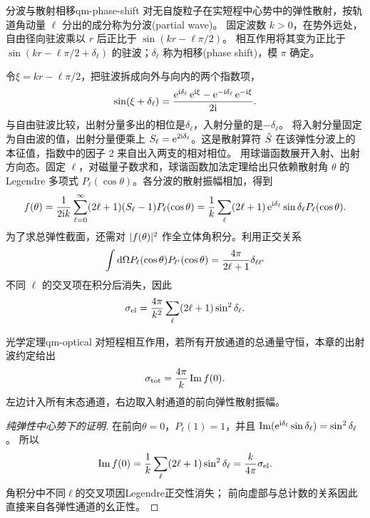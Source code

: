\begin{definition}{分波与散射相移}{qm-phase-shift}
    对无自旋粒子在实短程中心势中的弹性散射，按轨道角动量 $\ell$ 分出的成分称为分波(partial wave)。
    固定波数 $k > 0$，在势外远处，自由径向驻波乘以 $r$ 后正比于 $\sin(kr - \ell\pi/2)$。
    相互作用将其变为正比于 $\sin(kr - \ell\pi/2 + \delta_\ell)$ 的驻波；$\delta_\ell$ 称为相移(phase shift)，模 $\pi$ 确定。
\end{definition}
令$\xi = kr - \ell\pi/2$，把驻波拆成向外与向内的两个指数项，
\[
    \sin(\xi + \delta_\ell)
    = \frac{\mathop{}\!\mathrm{e}^{\mathrm{i}\delta_\ell}\mathop{}\!\mathrm{e}^{\mathrm{i}\xi}
         - \mathop{}\!\mathrm{e}^{-\mathrm{i}\delta_\ell}\mathop{}\!\mathrm{e}^{-\mathrm{i}\xi}}{2\mathrm{i}}.
\]
与自由驻波比较，出射分量多出的相位是$\delta_\ell$，入射分量的是$-\delta_\ell$。
将入射分量固定为自由波的值，出射分量便乘上 $S_\ell = \mathop{}\!\mathrm{e}^{2\mathrm{i}\delta_\ell}$。这是散射算符 $\hat{S}$ 在该弹性分波上的本征值，指数中的因子 2 来自出入两支的相对相位。
用球谐函数展开入射、出射方向态。固定 $\ell$，对磁量子数求和，球谐函数加法定理给出只依赖散射角 $\theta$ 的 Legendre 多项式 $P_\ell(\cos\theta)$。各分波的散射振幅相加，得到
\begin{equation}
    f(\theta) = \frac1{2\mathrm{i} k}\sum_{\ell=0}^\infty(2\ell + 1)(S_\ell - 1)P_\ell(\cos\theta)
    = \frac1k\sum_\ell(2\ell + 1)\mathop{}\!\mathrm{e}^{\mathrm{i}\delta_\ell}\sin\delta_\ell P_\ell(\cos\theta).
\end{equation}
为了求总弹性截面，还需对 $\lvert f(\theta)\rvert^2$ 作全立体角积分。利用正交关系
\begin{equation}\label{eq:qm-legendre-angular-orthogonality}
    \int\mathop{}\!\mathrm{d}\Omega P_\ell(\cos\theta)P_{\ell'}(\cos\theta) = \frac{4\pi}{2\ell + 1}\delta_{\ell\ell'}
\end{equation}
不同 $\ell$ 的交叉项在积分后消失，因此
\begin{equation}
    \sigma_{\mathrm{el}} = \frac{4\pi}{k^2}\sum_\ell(2\ell + 1)\sin^2\delta_\ell .
\end{equation}
\begin{theorem}{光学定理}{qm-optical}
    对短程相互作用，若所有开放通道的总通量守恒，本章的出射波约定给出
    \begin{equation}
        \sigma_{\mathrm{tot}} = \frac{4\pi}{k}\operatorname{Im} f(0).
    \end{equation}
    左边计入所有末态通道，右边取入射通道的前向弹性散射振幅。
\end{theorem}
\begin{proof}[纯弹性中心势下的证明]
    在前向$\theta = 0$，$P_\ell(1) = 1$，并且
    $\operatorname{Im}(\mathop{}\!\mathrm{e}^{\mathrm{i}\delta_\ell}\sin\delta_\ell) = \sin^2\delta_\ell$。
    所以
    \begin{equation}
        \operatorname{Im} f(0) = \frac1k\sum_\ell(2\ell + 1)\sin^2\delta_\ell
        = \frac{k}{4\pi}\sigma_{\mathrm{el}}.
    \end{equation}
    角积分中不同$\ell$的交叉项因Legendre正交性消失；
    前向虚部与总计数的关系因此直接来自各弹性通道的幺正性。
\end{proof}

